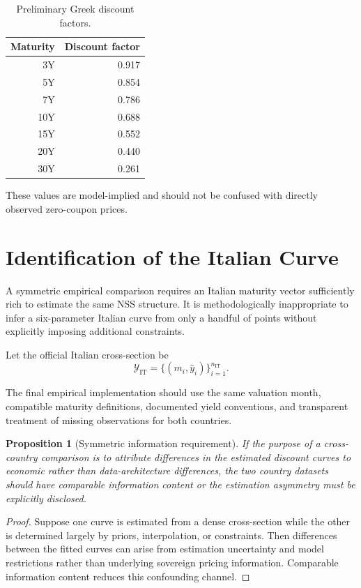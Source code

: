 \documentclass[a4paper,10pt]{article}
\newtheorem{proposition}{Proposition}[section]
\theoremstyle{remark}
\begin{document}
\begin{table}[H]
\centering
\caption{Preliminary Greek discount factors.}
\begin{tabular}{rr}
\toprule
Maturity & Discount factor\\
\midrule
3Y & 0.917\\
5Y & 0.854\\
7Y & 0.786\\
10Y & 0.688\\
15Y & 0.552\\
20Y & 0.440\\
30Y & 0.261\\
\bottomrule
\end{tabular}
\end{table}

These values are model-implied and should not be confused with directly observed zero-coupon prices.

\section{Identification of the Italian Curve}

A symmetric empirical comparison requires an Italian maturity vector sufficiently rich to estimate the same NSS structure. It is methodologically inappropriate to infer a six-parameter Italian curve from only a handful of points without explicitly imposing additional constraints.

Let the official Italian cross-section be
\begin{equation}
\mathcal{Y}_{\mathrm{IT}}
=\{(m_i,\hat y_i)\}_{i=1}^{n_{\mathrm{IT}}}.
\end{equation}

The final empirical implementation should use the same valuation month, compatible maturity definitions, documented yield conventions, and transparent treatment of missing observations for both countries.

\begin{proposition}[Symmetric information requirement]
If the purpose of a cross-country comparison is to attribute differences in the estimated discount curves to economic rather than data-architecture differences, the two country datasets should have comparable information content or the estimation asymmetry must be explicitly disclosed.
\end{proposition}

\begin{proof}
Suppose one curve is estimated from a dense cross-section while the other is determined largely by priors, interpolation, or constraints. Then differences between the fitted curves can arise from estimation uncertainty and model restrictions rather than underlying sovereign pricing information. Comparable information content reduces this confounding channel.\end{proof}
\end{document}
